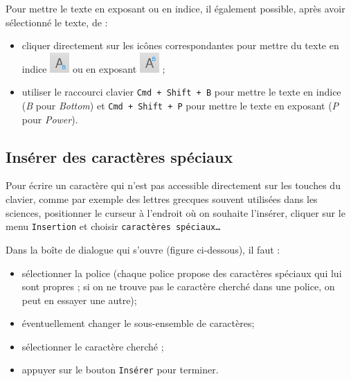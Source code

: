Pour mettre le texte en exposant ou en indice, il également possible, après avoir sélectionné le texte, de :
\begin{itemize}
\item cliquer directement sur les icônes correspondantes pour mettre du texte en indice \includegraphics[width=.6cm]{./images/texte03/texte3indiceIcone} ou en exposant \includegraphics[width=.6cm]{./images/texte03/texte3exposantIcone} ;
\item utiliser le raccourci clavier \texttt{Cmd + Shift + B} pour mettre le texte en indice (\emph{B} pour \emph{Bottom}) et \texttt{Cmd + Shift + P} pour mettre le texte en exposant (\emph{P} pour \emph{Power}). 
\end{itemize}


\subsection{Insérer des caractères spéciaux}\label{Texte3caracteresSpeciaux}

Pour écrire un caractère qui n'est pas accessible directement sur les touches du clavier, comme par exemple des lettres grecques souvent utilisées dans les sciences, positionner le curseur à l'endroit où on souhaite l'insérer, cliquer sur le menu \texttt{Insertion} et choisir \texttt{caractères spéciaux…}


Dans la boîte de dialogue qui s'ouvre (figure ci-dessous), il faut :
\begin{itemize}
\item {} sélectionner la police (chaque police propose des caractères spéciaux qui lui sont propres ; si on ne trouve pas le caractère cherché dans une police, on peut en essayer une autre);
\item {} éventuellement changer le sous-ensemble de caractères;
\item {} sélectionner le caractère cherché ;
\item {} appuyer sur le bouton \texttt{Insérer} pour terminer.
\end{itemize}

